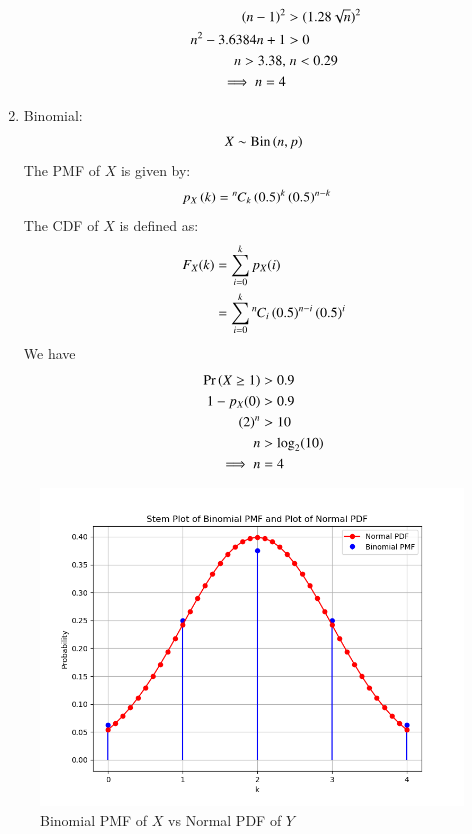 \documentclass[journal,12pt,twocolumn]{IEEEtran}
\theoremstyle{remark}
\begin{document}
\begin{enumerate}
\begin{enumerate}
\begin{align}
	\left(n-1\right)^2 &> (1.28\sqrt{n})^2\\
	n^2 - 3.6384n + 1 &> 0\\
	n > 3.38, &\; n < 0.29\\
	\implies n = 4
\end{align}
\end{enumerate}
\item Binomial:
\begin{align}
	X \sim \mathrm{Bin}\left(n, p\right)
\end{align} 
The PMF of $X$ is given by:
\begin{align}
p_X\left(k\right) &= {{}^{n}\mkern-1muC_{k}}\left(0.5\right)^k\left(0.5\right)^{n-k}
\end{align} 
The CDF of $X$ is defined as:
\begin{align}
F_X(k) &= \sum_{i=0}^{k}p_X(i)\\
&= \sum_{i=0}^{k}{{}^{n}\mkern-1muC_{i}}\left(0.5\right)^{n-i}\left(0.5\right)^i
\end{align}
We have
\begin{align}
\Pr\left(X\geq 1\right) &> 0.9 \\
1 - p_{X}(0) &> 0.9\\
\left(2\right)^n &> 10\\
n&>\log_2(10)\\
\implies n &= 4
\end{align}
\end{enumerate}
\newpage
\begin{figure}
\includegraphics[width=\columnwidth]{./figs/main.png}
\caption{Binomial PMF of $X$ vs Normal PDF of $Y$}
\label{fig:gaussian_Y vs binomial_Y}
\end{figure}
\end{document}
